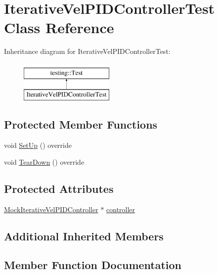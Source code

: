 \hypertarget{classIterativeVelPIDControllerTest}{}\section{Iterative\+Vel\+P\+I\+D\+Controller\+Test Class Reference}
\label{classIterativeVelPIDControllerTest}
Inheritance diagram for Iterative\+Vel\+P\+I\+D\+Controller\+Test\+:\begin{figure}[H]
\begin{center}
\leavevmode
\includegraphics[height=2.000000cm]{classIterativeVelPIDControllerTest}
\end{center}
\end{figure}
\subsection*{Protected Member Functions}
\begin{DoxyCompactItemize}
\item 
void \mbox{\hyperlink{classIterativeVelPIDControllerTest_a96e0f5d45fc082b1e2d670ed122ebd3e}{Set\+Up}} () override
\item 
void \mbox{\hyperlink{classIterativeVelPIDControllerTest_a72c907e7a9f5b8cf3bec694086f247dc}{Tear\+Down}} () override
\end{DoxyCompactItemize}
\subsection*{Protected Attributes}
\begin{DoxyCompactItemize}
\item 
\mbox{\hyperlink{classMockIterativeVelPIDController}{Mock\+Iterative\+Vel\+P\+I\+D\+Controller}} $\ast$ \mbox{\hyperlink{classIterativeVelPIDControllerTest_a05c720b442899f45f64c96117456b643}{controller}}
\end{DoxyCompactItemize}
\subsection*{Additional Inherited Members}


\subsection{Member Function Documentation}
\mbox{\label{classIterativeVelPIDControllerTest_a96e0f5d45fc082b1e2d670ed122ebd3e}} 
